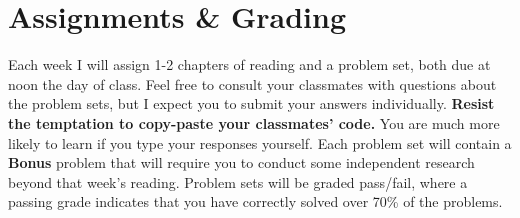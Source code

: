 \documentclass[11pt, letterpaper]{article}
\begin{document}
%
%
%
%

\section*{Assignments \& Grading}

Each week I will assign 1-2 chapters of reading and a problem set, both due at noon the day of class. Feel free to consult your classmates with questions about the problem sets, but I expect you to submit your answers individually. \textbf{Resist the temptation to copy-paste your classmates' code.} You are much more likely to learn if you type your responses yourself. Each problem set will contain a \textbf{Bonus} problem that will require you to conduct some independent research beyond that week's reading. Problem sets will be graded pass/fail, where a passing grade indicates that you have correctly solved over 70\% of the problems. 
\end{document}
